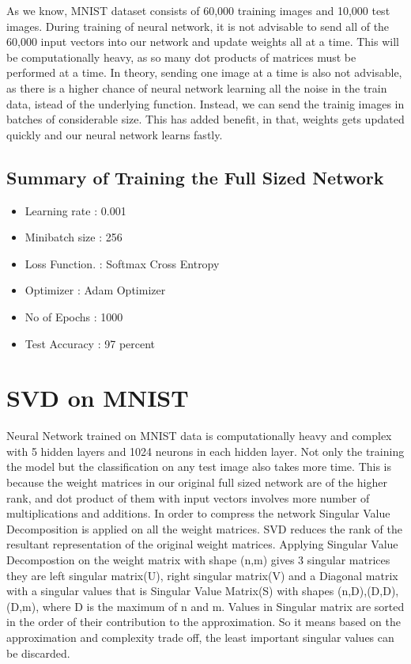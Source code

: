 As we know, MNIST dataset consists of 60,000 training images and 10,000 test
images. During training of neural network, it is not advisable to send all of
the 60,000 input vectors into our network and update weights all at a time.
This will be computationally heavy, as so many dot products of matrices must
be performed at a time. In theory, sending one image at a time is also not
advisable, as there is a higher chance of neural network learning all the
noise in the train data, istead of the underlying function. Instead, we can
send the trainig images in batches of considerable size. This has added
benefit, in that, weights gets updated quickly and our neural network learns
fastly.


\subsection{Summary of Training the Full Sized Network}

\begin{itemize}

 \item Learning rate  : 0.001
 \item Minibatch size : 256
 \item Loss Function. : Softmax Cross Entropy
 \item Optimizer      : Adam Optimizer
 \item No of Epochs   : 1000
 \item Test Accuracy  : 97 percent

\end{itemize}

\section{SVD on MNIST}

Neural Network trained on MNIST data is computationally heavy and complex with 5
hidden layers and 1024 neurons in each hidden layer. Not only the training the
model but the classification on any test image also takes more time.  This is
because the weight matrices in our original full sized network are of the higher
rank, and dot product of them with input vectors involves more number of
multiplications and additions.   In order to compress the network Singular Value
Decomposition is applied on all the weight matrices. SVD reduces the rank of the
resultant representation of the original weight matrices. Applying Singular
Value Decompostion on the weight matrix with shape (n,m) gives 3 singular
matrices they are left singular matrix(U), right singular matrix(V) and a
Diagonal matrix with a singular values that is Singular Value Matrix(S) with
shapes (n,D),(D,D),(D,m),  where D is the maximum of n and m. Values in Singular
matrix are sorted in the order of their contribution to the approximation. So it
means based on the approximation and complexity trade off, the  least important
singular values can be discarded.

